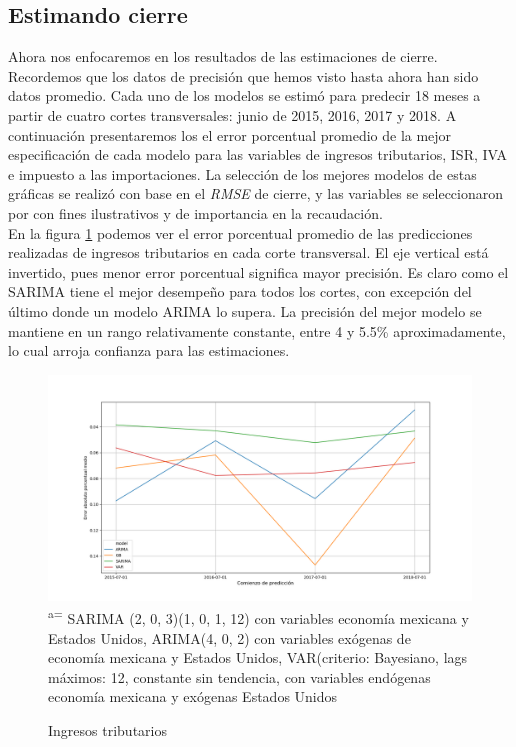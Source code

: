 \documentclass[a4paper, 11pt]{article}
\begin{document}
\subsection*{Estimando cierre}
Ahora nos enfocaremos en los resultados de las estimaciones de cierre. Recordemos que los datos de precisión que hemos visto hasta ahora han sido datos promedio. Cada uno de los modelos se estimó para predecir 18 meses a partir de cuatro cortes transversales: junio de 2015, 2016, 2017 y 2018. A continuación presentaremos los el error porcentual promedio de la mejor especificación de cada modelo para las variables de ingresos tributarios, ISR, IVA e impuesto a las importaciones. La selección de los mejores modelos de estas gráficas se realizó con base en el \textit{RMSE} de cierre, y las variables se seleccionaron por con fines ilustrativos y de importancia en la recaudación.\\
En la figura \ref{fig:ing_trib} podemos ver el error porcentual promedio de las predicciones realizadas de ingresos tributarios en cada corte transversal. El eje vertical está invertido, pues menor error porcentual significa mayor precisión. Es claro como el SARIMA tiene el mejor desempeño para todos los cortes, con excepción del último donde un modelo ARIMA lo supera. La precisión del mejor modelo se mantiene en un rango relativamente constante, entre 4 y 5.5\% aproximadamente, lo cual arroja confianza para las estimaciones. 
\begin{figure}[hbt!]
    \centering
     \caption{Ingresos tributarios}
     \label{fig:ing_trib}
     \includegraphics[scale = 0.4]{figures/ing_trib_neto_(mdp)_r_prec_cierre}
     \small\textsuperscript{a=} SARIMA (2, 0, 3)(1, 0, 1, 12) con variables economía mexicana y Estados Unidos, ARIMA(4, 0, 2) con variables exógenas de economía mexicana y Estados Unidos, VAR(criterio: Bayesiano, lags máximos: 12, constante sin tendencia, con variables endógenas economía mexicana y exógenas Estados Unidos
\end{figure}
\end{document}
